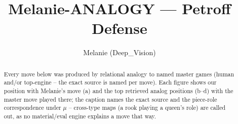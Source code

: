 \documentclass[11pt]{article}
\title{Melanie-ANALOGY — Petroff Defense}
\author{Melanie (Deep\_Vision)}
\date{}
\begin{document}
\maketitle

\begin{abstract}Every move below was produced by relational analogy to named master games (human and/or top-engine -- the exact source is named per move). Each figure shows our position with Melanie's move (a) and the top retrieved analog positions (b--d) with the master move played there; the caption names the exact source and the piece-role correspondence under $\mu$ -- cross-type maps (a rook playing a queen's role) are called out, as no material/eval engine explains a move that way.\end{abstract}

\begin{figure}[p]\centering
\begin{subfigure}{0.46\textwidth}\centering
\resizebox{\linewidth}{!}{%
\newchessgame
\chessboard[
  setfen={r1bqkb1r/ppp2ppp/2n5/3p4/3Pn3/3B1N2/PPP2PPP/RNBQK2R w KQkq - 2 7},
  showmover=false,
  pgfstyle=straightmove, color=movearrow, markmove={e1-g1}
]}
\caption{}
\end{subfigure}\hfill
\begin{subfigure}{0.46\textwidth}\centering
\resizebox{\linewidth}{!}{%
\newchessgame
\chessboard[
  setfen={rnbqk2r/ppp1bppp/8/3p4/3Pn3/3B1N2/PPP2PPP/RNBQK2R w KQkq - 2 7},
  showmover=false,
  pgfstyle=straightmove, color=movearrow, markmove={e1-g1}
]}
\caption{}
\end{subfigure}
\\[4pt]
\begin{subfigure}{0.46\textwidth}\centering
\resizebox{\linewidth}{!}{%
\newchessgame
\chessboard[
  setfen={rnbqk2r/ppp1bppp/8/3p4/3Pn3/3B1N2/PPP2PPP/RNBQK2R w KQkq - 2 7},
  showmover=false,
  pgfstyle=straightmove, color=movearrow, markmove={e1-g1}
]}
\caption{}
\end{subfigure}\hfill
\begin{subfigure}{0.46\textwidth}\centering
\resizebox{\linewidth}{!}{%
\newchessgame
\chessboard[
  setfen={rnbqk2r/ppp1bppp/8/3p4/3Pn3/3B1N2/PPP2PPP/RNBQK2R w KQkq - 2 7},
  showmover=false,
  pgfstyle=straightmove, color=movearrow, markmove={e1-g1}
]}
\caption{}
\end{subfigure}

\end{figure}
\end{document}
